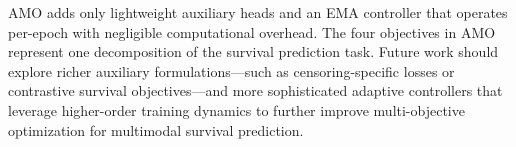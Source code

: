 \documentclass[10pt,twocolumn,letterpaper]{article}
\begin{document}
AMO adds only lightweight auxiliary heads and an EMA controller
that operates per-epoch with negligible computational overhead.
The four objectives in AMO represent one decomposition of the
survival prediction task. Future work should explore richer
auxiliary formulations---such as censoring-specific losses or
contrastive survival objectives---and more sophisticated adaptive
controllers that leverage higher-order training dynamics to further
improve multi-objective optimization for multimodal survival
prediction.


{
    \small
    
    
}
\end{document}
